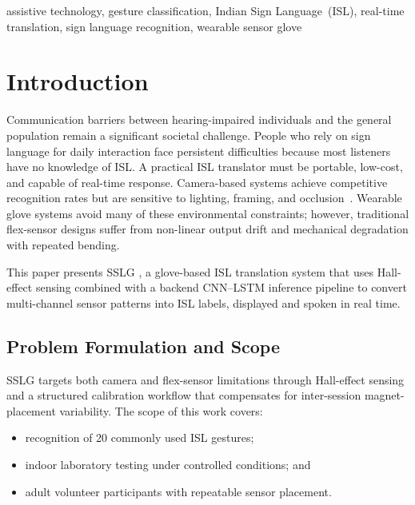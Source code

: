 \documentclass[conference]{IEEEtran}
\newcommand{\SystemAcronym}{SSLG }
\begin{document}
\begin{IEEEkeywords}
assistive technology, gesture classification, Indian Sign Language~(ISL),
real-time translation, sign language recognition, wearable sensor glove
\end{IEEEkeywords}

\section{Introduction}

Communication barriers between hearing-impaired individuals and the general
population remain a significant societal challenge. People who rely on sign
language for daily interaction face persistent difficulties because most
listeners have no knowledge of ISL. A practical ISL translator must be
portable, low-cost, and capable of real-time response. Camera-based systems
achieve competitive recognition rates but are sensitive to lighting, framing,
and occlusion~\cite{mitra}. Wearable glove systems avoid many of these
environmental constraints; however, traditional flex-sensor designs suffer from
non-linear output drift and mechanical degradation with repeated bending.

This paper presents \SystemAcronym, a glove-based ISL translation system that
uses Hall-effect sensing combined with a backend CNN--LSTM inference pipeline to
convert multi-channel sensor patterns into ISL labels, displayed and spoken in
real time.

\subsection{Problem Formulation and Scope}

\SystemAcronym targets both camera and flex-sensor limitations through
Hall-effect sensing and a structured calibration workflow that compensates for
inter-session magnet-placement variability. The scope of this work covers:
\begin{itemize}[noitemsep, topsep=2pt]
  \item recognition of 20 commonly used ISL gestures;
  \item indoor laboratory testing under controlled conditions; and
  \item adult volunteer participants with repeatable sensor placement.
\end{itemize}
\end{document}
